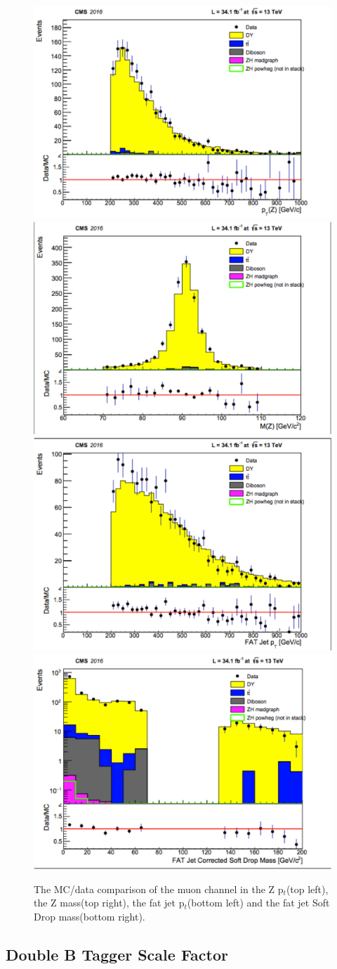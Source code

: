 \documentclass{article}
\begin{document}
\begin{figure}
\centering
\includegraphics[width=.45\textwidth]{figures/mu_Zpt.pdf}\quad
\includegraphics[width=.45\textwidth]{figures/mu_Zmass.pdf}
\medskip
\includegraphics[width=.45\textwidth]{figures/mu_Jetpt.pdf}\quad
\includegraphics[width=.45\textwidth]{figures/mu_JetSDmass.pdf}
\caption{The MC/data comparison of the muon channel in the Z p$_{t}$(top left), the Z mass(top right), the fat jet p$_{t}$(bottom left) and the fat jet Soft Drop mass(bottom right).}
\label{pics:blablabla}
\end{figure}



\subsection{Double B Tagger Scale Factor}
\end{document}
